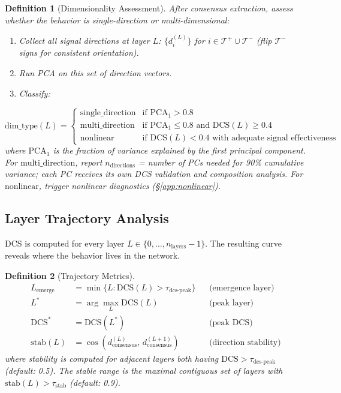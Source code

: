 \documentclass[11pt]{article}
\newtheorem{definition}{Definition}[section]
\begin{document}
\begin{definition}[Dimensionality Assessment]
\label{def:dimensionality-assessment}
After consensus extraction, assess whether the behavior is single-direction or multi-dimensional:
\begin{enumerate}[nosep]
\item Collect all signal directions at layer $L$: $\{d^{(L)}_i\}$ for $i \in \mathcal{T}^+ \cup \mathcal{T}^-$ (flip $\mathcal{T}^-$ signs for consistent orientation).
\item Run PCA on this set of direction vectors.
\item Classify:
\end{enumerate}
\begin{equation}
\text{dim\_type}(L) = \begin{cases}
\text{single\_direction} & \text{if } \text{PCA}_1 > 0.8 \\
\text{multi\_direction} & \text{if } \text{PCA}_1 \leq 0.8 \text{ and } \text{DCS}(L) \geq 0.4 \\
\text{nonlinear} & \text{if } \text{DCS}(L) < 0.4 \text{ with adequate signal effectiveness}
\end{cases}
\end{equation}
where $\text{PCA}_1$ is the fraction of variance explained by the first principal component. For $\text{multi\_direction}$, report $n_{\text{directions}}$ = number of PCs needed for 90\% cumulative variance; each PC receives its own DCS validation and composition analysis. For $\text{nonlinear}$, trigger nonlinear diagnostics (\S\ref{app:nonlinear}).
\end{definition}

\subsection{Layer Trajectory Analysis}
\label{app:layer-trajectory}

DCS is computed for every layer $L \in \{0, \ldots, n_{\text{layers}}-1\}$. The resulting curve reveals where the behavior lives in the network.

\begin{definition}[Trajectory Metrics]
\label{def:trajectory-metrics}
\begin{align}
L_{\text{emerge}} &= \min\{L : \text{DCS}(L) > \tau_{\text{dcs-peak}}\} & &\text{(emergence layer)} \\
L^* &= \arg\max_L \text{DCS}(L) & &\text{(peak layer)} \\
\text{DCS}^* &= \text{DCS}(L^*) & &\text{(peak DCS)} \\
\text{stab}(L) &= \cos(d^{(L)}_{\text{consensus}},\, d^{(L+1)}_{\text{consensus}}) & &\text{(direction stability)}
\end{align}
where stability is computed for adjacent layers both having $\text{DCS} > \tau_{\text{dcs-peak}}$ (default: 0.5). The stable range is the maximal contiguous set of layers with $\text{stab}(L) > \tau_{\text{stab}}$ (default: 0.9).
\end{definition}
\end{document}
